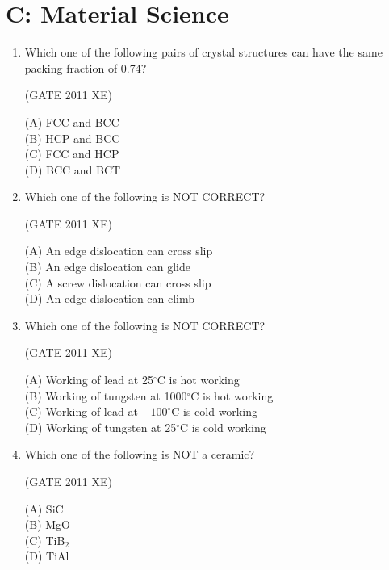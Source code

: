 \documentclass[journal,12pt,onecolumn]{IEEEtran}
\begin{document}
\section{C: Material Science}
\bigskip
\begin{enumerate}

\item Which one of the following pairs of crystal structures can have the same packing fraction of 0.74?

\hfill{(GATE 2011 XE)}\\
\begin{multicols}{4}
(A) FCC and BCC \\
(B) HCP and BCC \\
(C) FCC and HCP \\
(D) BCC and BCT
\end{multicols}

\item Which one of the following is NOT CORRECT?

\hfill{(GATE 2011 XE)}\\
\begin{multicols}{2}
(A) An edge dislocation can cross slip \\
(B) An edge dislocation can glide \\
(C) A screw dislocation can cross slip \\
(D) An edge dislocation can climb
\end{multicols}

\item Which one of the following is NOT CORRECT?

\hfill{(GATE 2011 XE)}\\
\begin{multicols}{2}
(A) Working of lead at 25$^\circ$C is hot working \\
(B) Working of tungsten at 1000$^\circ$C is hot working \\
(C) Working of lead at $-100^\circ$C is cold working \\
(D) Working of tungsten at 25$^\circ$C is cold working
\end{multicols}

\item Which one of the following is NOT a ceramic?

\hfill{(GATE 2011 XE)}\\
\begin{multicols}{4}
(A) SiC \\
(B) MgO \\
(C) TiB$_2$ \\
(D) TiAl
\end{multicols}


\end{enumerate}
\end{document}
